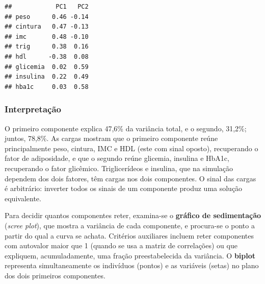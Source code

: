 \documentclass[
]{book}
\begin{document}
\begin{verbatim}
##            PC1   PC2
## peso      0.46 -0.14
## cintura   0.47 -0.13
## imc       0.48 -0.10
## trig      0.38  0.16
## hdl      -0.38  0.08
## glicemia  0.02  0.59
## insulina  0.22  0.49
## hba1c     0.03  0.58
\end{verbatim}

\subsubsection{Interpretação}\label{interpretauxe7uxe3o}

O primeiro componente explica 47,6\% da variância total, e o segundo, 31,2\%; juntos, 78,8\%. As cargas mostram que o primeiro componente reúne principalmente peso, cintura, IMC e HDL (este com sinal oposto), recuperando o fator de adiposidade, e que o segundo reúne glicemia, insulina e HbA1c, recuperando o fator glicêmico. Triglicerídeos e insulina, que na simulação dependem dos dois fatores, têm cargas nos dois componentes. O sinal das cargas é arbitrário: inverter todos os sinais de um componente produz uma solução equivalente.

Para decidir quantos componentes reter, examina-se o \textbf{gráfico de sedimentação} (\emph{scree plot}), que mostra a variância de cada componente, e procura-se o ponto a partir do qual a curva se achata. Critérios auxiliares incluem reter componentes com autovalor maior que 1 (quando se usa a matriz de correlações) ou que expliquem, acumuladamente, uma fração preestabelecida da variância. O \textbf{biplot} representa simultaneamente os indivíduos (pontos) e as variáveis (setas) no plano dos dois primeiros componentes.
\end{document}
